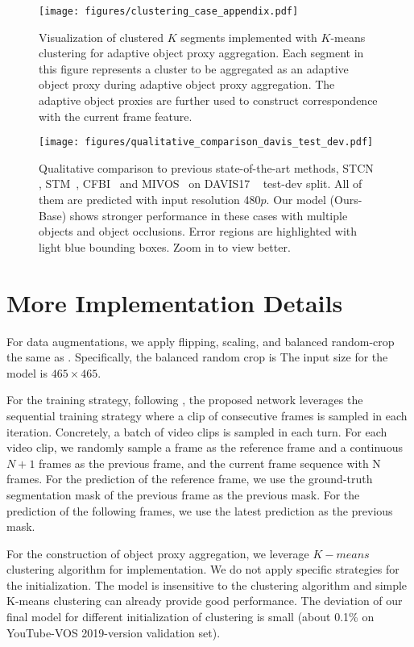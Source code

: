 \documentclass[sigconf]{acmart}
\begin{document}
 
\begin{figure*}[t]
	\centering
	\texttt{[image: figures/clustering\_case\_appendix.pdf]}
\caption{Visualization of clustered $K$ segments implemented with $K$-means clustering for adaptive object proxy aggregation. Each segment in this figure represents a cluster to be aggregated as an adaptive object proxy during adaptive object proxy aggregation. The adaptive object proxies are further used to construct correspondence with the current frame feature.}
	\label{fig:clustering_appendix}
\end{figure*} \begin{figure*}[ht!]
	\centering
	\texttt{[image: figures/qualitative\_comparison\_davis\_test\_dev.pdf]}
\caption{Qualitative comparison to previous state-of-the-art methods, STCN \cite{cheng2021rethinking}, STM~\cite{oh2019video}, CFBI~\cite{yang2020collaborative} and MIVOS~\cite{cheng2021modular} on DAVIS17 ~\cite{ponttuset20182017} test-dev split. All of them are predicted with input resolution 480$p$. Our model (Ours-Base) shows stronger performance in these cases with multiple objects and object occlusions. Error regions are highlighted with light blue bounding boxes. Zoom in to view better.}
	\label{fig:qualitative_comparison_test_dev}
\end{figure*} 
\section{More Implementation Details}
For data augmentations, we apply flipping, scaling, and balanced random-crop the same as \cite{yang2020collaborative}. Specifically, the balanced random crop is The input size for the model is $465 \times 465$.

For the training strategy, following \cite{oh2018fast,yang2020collaborative,yang2021collaborative}, the proposed network leverages the sequential training strategy where a clip of consecutive frames is sampled in each iteration. Concretely, a batch of video clips is sampled in each turn. For each video clip, we randomly sample a frame as the reference frame and a continuous $N + 1$ frames as the previous frame, and the current frame sequence with N frames. For the prediction of the reference frame, we use the ground-truth segmentation mask of the previous frame as the previous mask. For the prediction of the following frames, we use the latest prediction as the previous mask. 

For the construction of object proxy aggregation, we leverage $K-means$ clustering algorithm for implementation. We do not apply specific strategies for the initialization. 
The model is insensitive to the clustering algorithm and simple K-means clustering can already provide good performance.
The deviation of our final model for different initialization of clustering is small (about 0.1\% on YouTube-VOS\cite{xu2018youtube} 2019-version validation set). 
\end{document}
